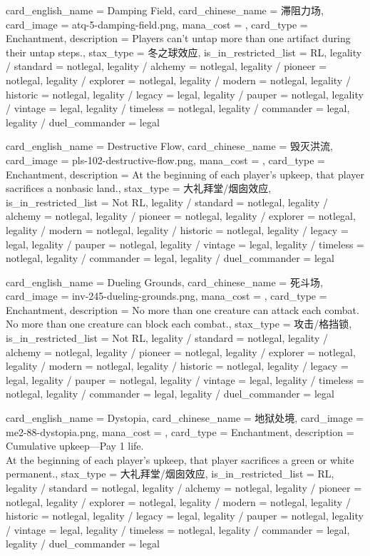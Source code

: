 \documentclass[lang = cn, color = black, 10pt]{AllThatStax}
\begin{document}
\card
{
	card_english_name = {Damping Field},
	card_chinese_name = {滞阻力场},
	card_image = atq-5-damping-field.png,
	mana_cost = ,
	card_type = Enchantment,
	description = {Players can't untap more than one artifact during their untap steps.},
	stax_type = 冬之球效应,
	is_in_restricted_list = RL,
	legality / standard = notlegal,
	legality / alchemy = notlegal,
	legality / pioneer = notlegal,
	legality / explorer = notlegal,
	legality / modern = notlegal,
	legality / historic = notlegal,
	legality / legacy = legal,
	legality / pauper = notlegal,
	legality / vintage = legal,
	legality / timeless = notlegal,
	legality / commander = legal,
	legality / duel_commander = legal
}

\card
{
	card_english_name = {Destructive Flow},
	card_chinese_name = {毁灭洪流},
	card_image = pls-102-destructive-flow.png,
	mana_cost = ,
	card_type = Enchantment,
	description = {At the beginning of each player's upkeep, that player sacrifices a nonbasic land.},
	stax_type = 大礼拜堂/烟囱效应,
	is_in_restricted_list = Not RL,
	legality / standard = notlegal,
	legality / alchemy = notlegal,
	legality / pioneer = notlegal,
	legality / explorer = notlegal,
	legality / modern = notlegal,
	legality / historic = notlegal,
	legality / legacy = legal,
	legality / pauper = notlegal,
	legality / vintage = legal,
	legality / timeless = notlegal,
	legality / commander = legal,
	legality / duel_commander = legal
}

\card
{
	card_english_name = {Dueling Grounds},
	card_chinese_name = {死斗场},
	card_image = inv-245-dueling-grounds.png,
	mana_cost = ,
	card_type = Enchantment,
	description = {No more than one creature can attack each combat.\\
		No more than one creature can block each combat.},
	stax_type = 攻击/格挡锁,
	is_in_restricted_list = Not RL,
	legality / standard = notlegal,
	legality / alchemy = notlegal,
	legality / pioneer = notlegal,
	legality / explorer = notlegal,
	legality / modern = notlegal,
	legality / historic = notlegal,
	legality / legacy = legal,
	legality / pauper = notlegal,
	legality / vintage = legal,
	legality / timeless = notlegal,
	legality / commander = legal,
	legality / duel_commander = legal
}

\card
{
	card_english_name = {Dystopia},
	card_chinese_name = {地狱处境},
	card_image = me2-88-dystopia.png,
	mana_cost = ,
	card_type = Enchantment,
	description = {Cumulative upkeep—Pay 1 life. \\
		At the beginning of each player's upkeep, that player sacrifices a green or white permanent.},
	stax_type = 大礼拜堂/烟囱效应,
	is_in_restricted_list = RL,
	legality / standard = notlegal,
	legality / alchemy = notlegal,
	legality / pioneer = notlegal,
	legality / explorer = notlegal,
	legality / modern = notlegal,
	legality / historic = notlegal,
	legality / legacy = legal,
	legality / pauper = notlegal,
	legality / vintage = legal,
	legality / timeless = notlegal,
	legality / commander = legal,
	legality / duel_commander = legal
}
\end{document}
